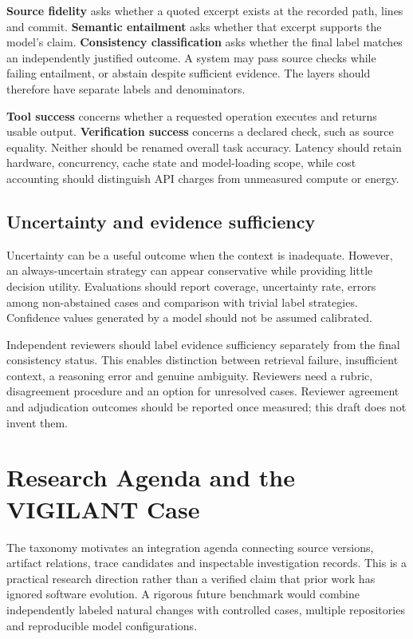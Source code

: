 \documentclass[conference,a4paper]{IEEEtran}
\begin{document}
\textbf{Source fidelity} asks whether a quoted excerpt exists at the recorded path, lines and commit. \textbf{Semantic entailment} asks whether that excerpt supports the model's claim. \textbf{Consistency classification} asks whether the final label matches an independently justified outcome. A system may pass source checks while failing entailment, or abstain despite sufficient evidence. The layers should therefore have separate labels and denominators.

\textbf{Tool success} concerns whether a requested operation executes and returns usable output. \textbf{Verification success} concerns a declared check, such as source equality. Neither should be renamed overall task accuracy. Latency should retain hardware, concurrency, cache state and model-loading scope, while cost accounting should distinguish API charges from unmeasured compute or energy.

\subsection{Uncertainty and evidence sufficiency}
Uncertainty can be a useful outcome when the context is inadequate. However, an always-uncertain strategy can appear conservative while providing little decision utility. Evaluations should report coverage, uncertainty rate, errors among non-abstained cases and comparison with trivial label strategies. Confidence values generated by a model should not be assumed calibrated.

Independent reviewers should label evidence sufficiency separately from the final consistency status. This enables distinction between retrieval failure, insufficient context, a reasoning error and genuine ambiguity. Reviewers need a rubric, disagreement procedure and an option for unresolved cases. Reviewer agreement and adjudication outcomes should be reported once measured; this draft does not invent them.

\section{Research Agenda and the VIGILANT Case}
The taxonomy motivates an integration agenda connecting source versions, artifact relations, trace candidates and inspectable investigation records. This is a practical research direction rather than a verified claim that prior work has ignored software evolution. A rigorous future benchmark would combine independently labeled natural changes with controlled cases, multiple repositories and reproducible model configurations.
\end{document}
